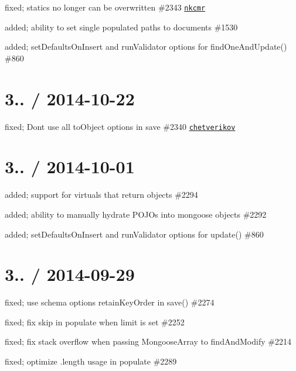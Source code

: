 \begin{DoxyItemize}
\item fixed; statics no longer can be overwritten \#2343 \href{https://github.com/chetverikov}{\tt nkcmr}
\item added; ability to set single populated paths to documents \#1530
\item added; set\+Defaults\+On\+Insert and run\+Validator options for find\+One\+And\+Update() \#860
\end{DoxyItemize}

\section*{3.. / 2014-\/10-\/22 }


\begin{DoxyItemize}
\item fixed; Dont use all to\+Object options in save \#2340 \href{https://github.com/chetverikov}{\tt chetverikov}
\end{DoxyItemize}

\section*{3.. / 2014-\/10-\/01 }


\begin{DoxyItemize}
\item added; support for virtuals that return objects \#2294
\item added; ability to manually hydrate P\+O\+J\+Os into mongoose objects \#2292
\item added; set\+Defaults\+On\+Insert and run\+Validator options for update() \#860
\end{DoxyItemize}

\section*{3.. / 2014-\/09-\/29 }


\begin{DoxyItemize}
\item fixed; use schema options retain\+Key\+Order in save() \#2274
\item fixed; fix skip in populate when limit is set \#2252
\item fixed; fix stack overflow when passing Mongoose\+Array to find\+And\+Modify \#2214
\item fixed; optimize .length usage in populate \#2289
\end{DoxyItemize}

